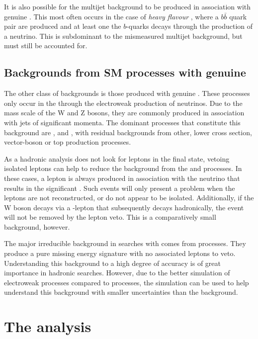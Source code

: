 It is also possible for the \QCD multijet background to be produced in
association with genuine \MET. This most often occurs in the case of
\emph{heavy flavour} \QCD, where a $b\bar{b}$ quark pair are produced
and at least one the $b$-quarks decays through the production of a
neutrino.  This is subdominant to the mismeasured multijet background,
but must still be accounted for. 


\subsection{Backgrounds from SM processes with genuine
\MET}

The other class of \SM backgrounds is those produced with genuine
\MET. These processes only occur in the \SM through the electroweak
production of neutrinos. Due to the
mass scale of the W and Z bosons, they are commonly produced in
association with jets of significant momenta. The dominant
processes that constitute this background are \wj, \zj and \ttbar,
with residual backgrounds from other, lower cross section,
vector-boson or top production processes.

As a hadronic analysis does not look for leptons in the final state,
vetoing isolated leptons can help to reduce the background from the
\wj and \ttbar processes. In these cases, a lepton is always produced
in association with the neutrino that results in the significant \MET.
Such events will only present a problem when the leptons are not
reconstructed, or do not appear to be isolated. Additionally, if the W boson
decays via a \tau-lepton that subsequently decays hadronically, the
event will not be removed by the lepton veto.  This is a comparatively
small background, however.

The major irreducible background in \BSM searches with \MET comes from 
\znunu processes. They produce a pure missing energy signature with no
associated leptons to veto. Understanding this background to a high
degree of accuracy is of great importance in hadronic \BSM searches. However, due
to the better simulation of electroweak processes compared to \QCD
processes, the simulation can be used to help understand this
background with smaller uncertainties than the \QCD background.

\section{The \alphat analysis} 

